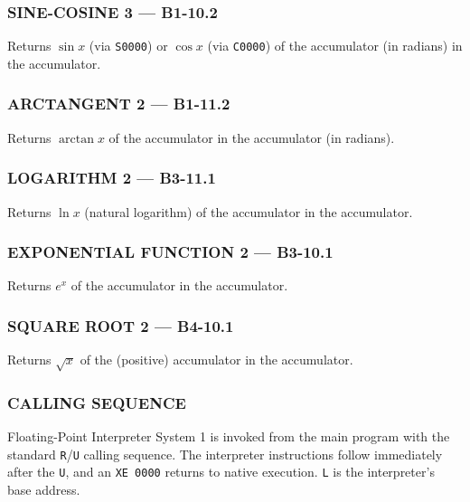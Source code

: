 \subsubsection*{SINE-COSINE 3 --- B1-10.2}
Returns $\sin x$ (via \texttt{S0000}) or $\cos x$ (via \texttt{C0000}) of the accumulator (in radians) in the accumulator.

\subsubsection*{ARCTANGENT 2 --- B1-11.2}
Returns $\arctan x$ of the accumulator in the accumulator (in radians).

\subsubsection*{LOGARITHM 2 --- B3-11.1}
Returns $\ln x$ (natural logarithm) of the accumulator in the accumulator.

\subsubsection*{EXPONENTIAL FUNCTION 2 --- B3-10.1}
Returns $e^x$ of the accumulator in the accumulator.

\subsubsection*{SQUARE ROOT 2 --- B4-10.1}
Returns $\sqrt{x}$ of the (positive) accumulator in the accumulator.

\subsubsection*{CALLING SEQUENCE}
Floating-Point Interpreter System 1 is invoked from the main program with the standard \texttt{R}/\texttt{U} calling sequence. The interpreter instructions follow immediately after the \texttt{U}, and an \texttt{XE 0000} returns to native execution. \texttt{L} is the interpreter's base address.

